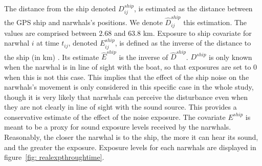 \documentclass[11pt]{article}
\newcommand {\1}{\mathbb{1}}
\theoremstyle{definition}
\theoremstyle{remark}
\theoremstyle{remark}
\begin{document}

The distance from the ship denoted $D^{ship}_{ij}$, is estimated as the distance between the GPS ship and narwhals's positions. We denote $\hat{D}^{ship}_{ij}$ this estimation. The values are comprised between $2.68$ and $63.8$ km.
Exposure to ship covariate for narwhal $i$ at time $t_{ij}$, denoted $E^{ship}_{ij}$, is defined as the inverse of the distance to the ship (in km) \cite{heide-jorgensen_behavioral_2021}. Its estimate $\hat{E}^{ship}$ is the inverse of $\hat{D}^{ship}$.
$D^{ship}$ is only known when the narwhal is in line of sight with the boat, so that exposures are set to $0$ when this is not this case. This implies that the effect of the ship noise on the narwhals's movement is only considered in this specific case in the whole study, though it is very likely that narwhals can perceive the disturbance even when they are not clearly in line of sight with the sound source. This provides a conservative estimate of the effect of the noise exposure. The covariate $E^{ship}$ is meant to be a proxy for sound exposure levels received by the narwhals. Reasonably, the closer the narwhal is to the ship, the more it can hear its sound, and the greater the exposure. Exposure levels for each narwhals are displayed in figure~\ref{fig: realexpthroughtime}.
\end{document}
